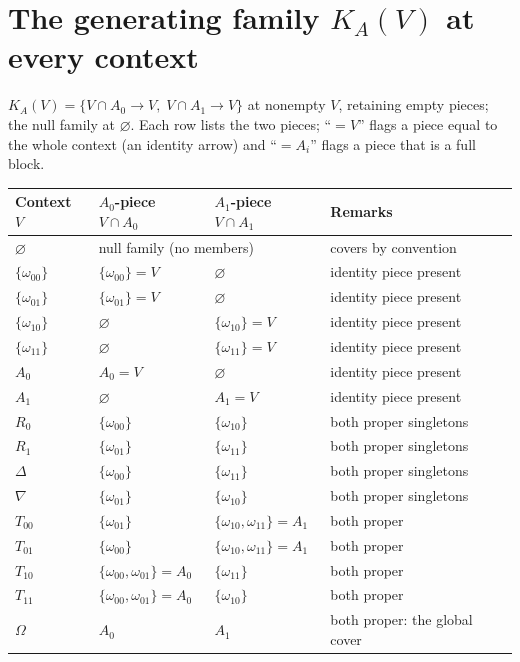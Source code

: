 \section{The generating family $K_A(V)$ at every context}
\label{appA:sec:ka}

$K_A(V) = \{ V \cap A_0 \to V,\; V \cap A_1 \to V \}$ at nonempty $V$,
retaining empty pieces; the null family at $\varnothing$. Each row lists
the two pieces; ``$= V$'' flags a piece equal to the whole context (an
identity arrow) and ``$= A_i$'' flags a piece that is a full block.

\begin{longtable}{@{}llll@{}}
\toprule
Context $V$ & $A_0$-piece $V \cap A_0$ & $A_1$-piece $V \cap A_1$ &
Remarks \\
\midrule
\endhead
\bottomrule
\endfoot
$\varnothing$ & \multicolumn{2}{l}{null family (no members)} &
covers by convention \\
$\{\omega_{00}\}$ & $\{\omega_{00}\} = V$ & $\varnothing$ &
identity piece present \\
$\{\omega_{01}\}$ & $\{\omega_{01}\} = V$ & $\varnothing$ &
identity piece present \\
$\{\omega_{10}\}$ & $\varnothing$ & $\{\omega_{10}\} = V$ &
identity piece present \\
$\{\omega_{11}\}$ & $\varnothing$ & $\{\omega_{11}\} = V$ &
identity piece present \\
$A_0$ & $A_0 = V$ & $\varnothing$ & identity piece present \\
$A_1$ & $\varnothing$ & $A_1 = V$ & identity piece present \\
$R_0$ & $\{\omega_{00}\}$ & $\{\omega_{10}\}$ & both proper singletons \\
$R_1$ & $\{\omega_{01}\}$ & $\{\omega_{11}\}$ & both proper singletons \\
$\Delta$ & $\{\omega_{00}\}$ & $\{\omega_{11}\}$ & both proper singletons \\
$\nabla$ & $\{\omega_{01}\}$ & $\{\omega_{10}\}$ & both proper singletons \\
$T_{00}$ & $\{\omega_{01}\}$ & $\{\omega_{10}, \omega_{11}\} = A_1$ &
both proper \\
$T_{01}$ & $\{\omega_{00}\}$ & $\{\omega_{10}, \omega_{11}\} = A_1$ &
both proper \\
$T_{10}$ & $\{\omega_{00}, \omega_{01}\} = A_0$ & $\{\omega_{11}\}$ &
both proper \\
$T_{11}$ & $\{\omega_{00}, \omega_{01}\} = A_0$ & $\{\omega_{10}\}$ &
both proper \\
$\Omega$ & $A_0$ & $A_1$ & both proper: the global cover \\
\end{longtable}

